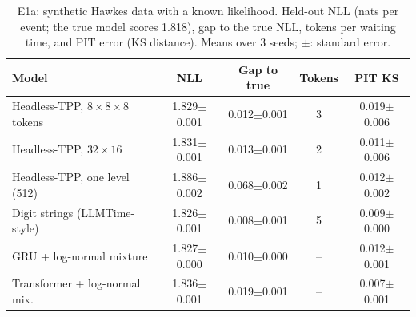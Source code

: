 \begin{table}[t]
\caption{E1a: synthetic Hawkes data with a known likelihood. Held-out NLL (nats per event; the true model scores 1.818), gap to the true NLL, tokens per waiting time, and PIT error (KS distance). Means over 3 seeds; $\pm$: standard error.}
\label{tab:rq1hawkes}
\footnotesize\setlength{\tabcolsep}{3pt}
\begin{tabular}{@{}lcccc@{}}
\toprule
Model & NLL & Gap to true & Tokens & PIT KS\\
\midrule
Headless-TPP, $8{\times}8{\times}8$ tokens & 1.829{\tiny$\pm$0.001} & 0.012{\tiny$\pm$0.001} & 3 & 0.019{\tiny$\pm$0.006}\\
Headless-TPP, $32{\times}16$ & 1.831{\tiny$\pm$0.001} & 0.013{\tiny$\pm$0.001} & 2 & 0.011{\tiny$\pm$0.006}\\
Headless-TPP, one level (512) & 1.886{\tiny$\pm$0.002} & 0.068{\tiny$\pm$0.002} & 1 & 0.012{\tiny$\pm$0.002}\\
Digit strings (LLMTime-style) & 1.826{\tiny$\pm$0.001} & 0.008{\tiny$\pm$0.001} & 5 & 0.009{\tiny$\pm$0.000}\\
GRU + log-normal mixture & 1.827{\tiny$\pm$0.000} & 0.010{\tiny$\pm$0.000} & -- & 0.012{\tiny$\pm$0.001}\\
Transformer + log-normal mix. & 1.836{\tiny$\pm$0.001} & 0.019{\tiny$\pm$0.001} & -- & 0.007{\tiny$\pm$0.001}\\
\bottomrule
\end{tabular}
\end{table}
